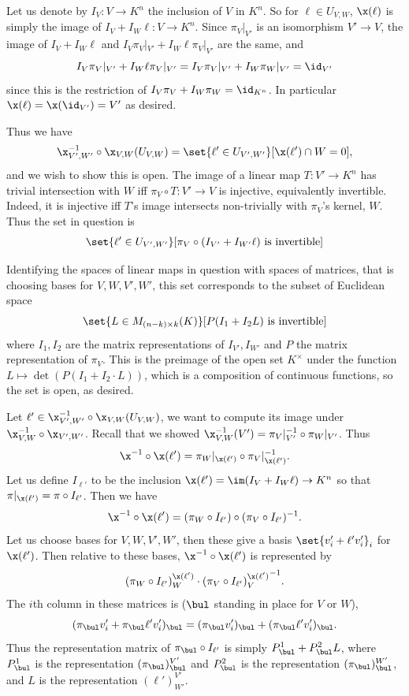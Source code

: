     Let us denote by $I_V\colon V\to K^n$ the inclusion of $V$ in $K^n$.
    So for $\ell\in U_{V,W}$, $\x(\ell)$ is simply the image of $I_V+I_W\ell\colon V\to K^n$.
    Since $\pi_V|_{V'}$ is an isomorphism $V'\to V$, the image of $I_V+I_W\ell$ and $I_V\pi_V|_{V'}+I_W\ell\pi_V|_{V'}$ are the same, and
    $$ I_V\pi_V|_{V'} + I_W\ell\pi_V|_{V'} = I_V\pi_V|_{V'} + I_W\pi_W|_{V'} = \id_{V'} $$
    since this is the restriction of $I_V\pi_V+I_W\pi_W=\id_{K^n}$.
    In particular $\x(\ell)=\x(\id_{V'})=V'$ as desired.

    Thus we have
    $$ \x_{V',W'}^{-1}\circ\x_{V,W}(U_{V,W}) = \set{\ell'\in U_{V',W'}}[\x(\ell')\cap W=0] , $$
    and we wish to show this is open.
    The image of a linear map $T\colon V'\to K^n$ has trivial intersection with $W$ iff $\pi_V\circ T\colon V'\to V$ is injective, equivalently invertible.
    Indeed, it is injective iff $T$'s image intersects non-trivially with $\pi_V$'s kernel, $W$.
    Thus the set in question is
    $$ \set{\ell'\in U_{V',W'}}[\pi_V\circ(I_{V'}+I_{W'}\ell)\hbox{ is invertible}] $$

    Identifying the spaces of linear maps in question with spaces of matrices, that is choosing bases for $V,W,V',W'$, this set corresponds to the subset of
    Euclidean space
    $$ \set{L\in M_{(n-k)\times k}(K)}[P(I_1+I_2L)\hbox{ is invertible}] $$
    where $I_1,I_2$ are the matrix representations of $I_{V'},I_{W'}$ and $P$ the matrix representation of $\pi_V$.
    This is the preimage of the open set $K^\times$ under the function $L\mapsto\det(P(I_1+I_2\cdot L))$, which is a composition of continuous functions, so the set is
    open, as desired.

    \item Let $\ell'\in\x_{V',W'}^{-1}\circ\x_{V,W}(U_{V,W})$, we want to compute its image under $\x_{V,W}^{-1}\circ\x_{V',W'}$.
    Recall that we showed $\x_{V,W}^{-1}(V')=\pi_V|_{V'}^{-1}\circ\pi_W|_{V'}$.
    Thus
    $$ \x^{-1}\circ\x(\ell') = \pi_W|_{\x(\ell')}\circ\pi_V|_{\x(\ell')}^{-1} . $$
    Let us define $I_{\ell'}$ to be the inclusion $\x(\ell')=\im(I_V+I_W\ell)\to K^n$ so that $\pi|_{\x(\ell')}=\pi\circ I_{\ell'}$.
    Then we have
    $$ \x^{-1}\circ\x(\ell') = (\pi_W\circ I_{\ell'})\circ(\pi_V\circ I_{\ell'})^{-1} . $$
    Let us choose bases for $V,W,V',W'$, then these give a basis $\set{v'_i+\ell'v'_i}_i$ for $\x(\ell')$.
    Then relative to these bases, $\x^{-1}\circ\x(\ell')$ is represented by
    $$ (\pi_W\circ I_{\ell'})^{\x(\ell')}_W \cdot {(\pi_V\circ I_{\ell'})^{\x(\ell')}_V}^{-1} . $$
    The $i$th column in these matrices is ($\bul$ standing in place for $V$ or $W$),
    $$ (\pi_\bul v'_i + \pi_\bul \ell'v'_i)_\bul  = (\pi_\bul v'_i)_\bul  + (\pi_\bul \ell'v'_i)_\bul  . $$
    Thus the representation matrix of $\pi_\bul \circ I_{\ell'}$ is simply $P^1_\bul +P^2_\bul L$, where $P^1_\bul $ is the representation $(\pi_\bul )^{V'}_\bul $ and $P^2_\bul $ is the representation
    $(\pi_\bul )^{W'}_\bul $, and $L$ is the representation $(\ell')^{V'}_{W'}$.

